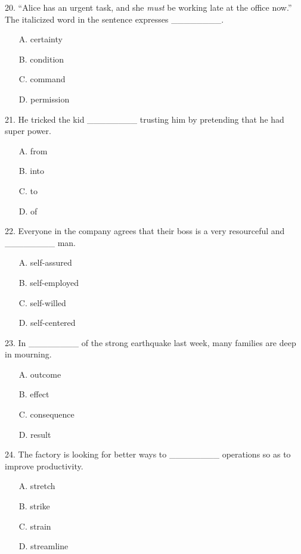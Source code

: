 \documentclass[UTF8,11pt]{ctexart}
\begin{document}
20. “Alice has an urgent task, and she \textit{must} be working late at the office now.” The italicized word in the sentence expresses \_\_\_\_\_\_\_\_.


\begin{itemize}[leftmargin=2em,itemsep=.2em,topsep=.4em]\item[A.] certainty
\item[B.] condition
\item[C.] command
\item[D.] permission
\end{itemize}

21. He tricked the kid \_\_\_\_\_\_\_\_ trusting him by pretending that he had super power.


\begin{itemize}[leftmargin=2em,itemsep=.2em,topsep=.4em]\item[A.] from
\item[B.] into
\item[C.] to
\item[D.] of
\end{itemize}

22. Everyone in the company agrees that their boss is a very resourceful and \_\_\_\_\_\_\_\_ man.


\begin{itemize}[leftmargin=2em,itemsep=.2em,topsep=.4em]\item[A.] self-assured
\item[B.] self-employed
\item[C.] self-willed
\item[D.] self-centered
\end{itemize}

23. In \_\_\_\_\_\_\_\_ of the strong earthquake last week, many families are deep in mourning.


\begin{itemize}[leftmargin=2em,itemsep=.2em,topsep=.4em]\item[A.] outcome
\item[B.] effect
\item[C.] consequence
\item[D.] result
\end{itemize}

24. The factory is looking for better ways to \_\_\_\_\_\_\_\_ operations so as to improve productivity.


\begin{itemize}[leftmargin=2em,itemsep=.2em,topsep=.4em]\item[A.] stretch
\item[B.] strike
\item[C.] strain
\item[D.] streamline
\end{itemize}
\end{document}
